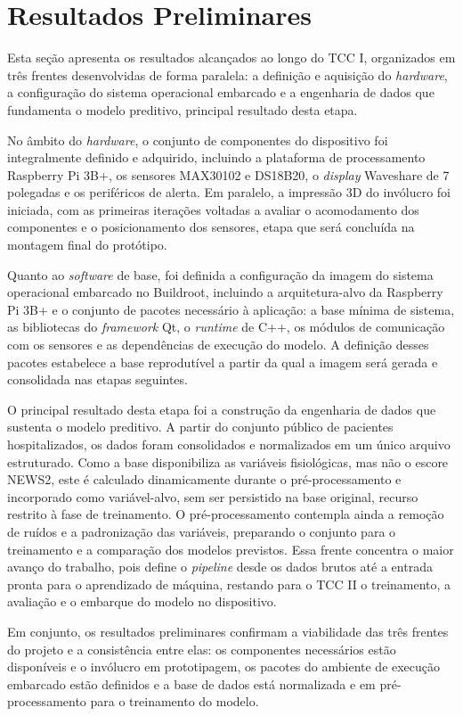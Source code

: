 \section{Resultados Preliminares}
\label{Resultados}

Esta seção apresenta os resultados alcançados ao longo do TCC I, organizados em três frentes desenvolvidas de forma paralela: a definição e aquisição do \textit{hardware}, a configuração do sistema operacional embarcado e a engenharia de dados que fundamenta o modelo preditivo, principal resultado desta etapa.

No âmbito do \textit{hardware}, o conjunto de componentes do dispositivo foi integralmente definido e adquirido, incluindo a plataforma de processamento Raspberry Pi 3B+, os sensores MAX30102 e DS18B20, o \textit{display} Waveshare de 7 polegadas e os periféricos de alerta. Em paralelo, a impressão 3D do invólucro foi iniciada, com as primeiras iterações voltadas a avaliar o acomodamento dos componentes e o posicionamento dos sensores, etapa que será concluída na montagem final do protótipo.

Quanto ao \textit{software} de base, foi definida a configuração da imagem do sistema operacional embarcado no Buildroot, incluindo a arquitetura-alvo da Raspberry Pi 3B+ e o conjunto de pacotes necessário à aplicação: a base mínima de sistema, as bibliotecas do \textit{framework} Qt, o \textit{runtime} de C++, os módulos de comunicação com os sensores e as dependências de execução do modelo. A definição desses pacotes estabelece a base reprodutível a partir da qual a imagem será gerada e consolidada nas etapas seguintes.

O principal resultado desta etapa foi a construção da engenharia de dados que sustenta o modelo preditivo. A partir do conjunto público de pacientes hospitalizados, os dados foram consolidados e normalizados em um único arquivo estruturado. Como a base disponibiliza as variáveis fisiológicas, mas não o escore NEWS2, este é calculado dinamicamente durante o pré-processamento e incorporado como variável-alvo, sem ser persistido na base original, recurso restrito à fase de treinamento. O pré-processamento contempla ainda a remoção de ruídos e a padronização das variáveis, preparando o conjunto para o treinamento e a comparação dos modelos previstos. Essa frente concentra o maior avanço do trabalho, pois define o \textit{pipeline} desde os dados brutos até a entrada pronta para o aprendizado de máquina, restando para o TCC II o treinamento, a avaliação e o embarque do modelo no dispositivo.

Em conjunto, os resultados preliminares confirmam a viabilidade das três frentes do projeto e a consistência entre elas: os componentes necessários estão disponíveis e o invólucro em prototipagem, os pacotes do ambiente de execução embarcado estão definidos e a base de dados está normalizada e em pré-processamento para o treinamento do modelo.

